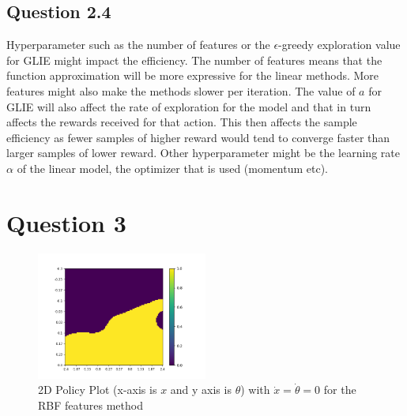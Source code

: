 \documentclass[a4paper]{article}
\begin{document}
\subsection*{Question 2.4}
Hyperparameter such as the number of features or the $\epsilon$-greedy exploration value for GLIE might impact the efficiency. The number of features means that the function approximation will be more expressive for the linear methods. More features might also make the methods slower per iteration. The value of $a$ for GLIE will also affect the rate of exploration for the model and that in turn affects the rewards received for that action. This then affects the sample efficiency as fewer samples of higher reward would tend to converge faster than larger samples of lower reward. Other hyperparameter might be the learning rate $\alpha$ of the linear model, the optimizer that is used (momentum etc).
\section*{Question 3}
\begin{figure}[h!]
    \centering
    \includegraphics[width=0.5\textwidth]{policy.png}
    \caption{2D Policy Plot (x-axis is $x$ and y axis is $\theta$) with $\dot{x}=\dot{\theta}=0$ for the RBF features method}
    \label{fig-policy}
\end{figure}
\end{document}
